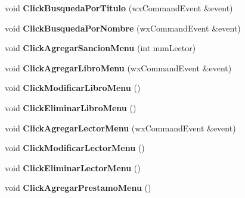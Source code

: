 \begin{DoxyCompactItemize}
\item 
void {\bfseries Click\+Busqueda\+Por\+Titulo} (wx\+Command\+Event \&event)\hypertarget{class_vprincipal_af929cb33fa3c5d6c3566a22a8b0de760}{}\label{class_vprincipal_af929cb33fa3c5d6c3566a22a8b0de760}

\item 
void {\bfseries Click\+Busqueda\+Por\+Nombre} (wx\+Command\+Event \&event)\hypertarget{class_vprincipal_ac2431b119c528a1395f56f426340d930}{}\label{class_vprincipal_ac2431b119c528a1395f56f426340d930}

\item 
void {\bfseries Click\+Agregar\+Sancion\+Menu} (int num\+Lector)\hypertarget{class_vprincipal_a4103b2f0ca0be4c514f3d81216df7805}{}\label{class_vprincipal_a4103b2f0ca0be4c514f3d81216df7805}

\item 
void {\bfseries Click\+Agregar\+Libro\+Menu} (wx\+Command\+Event \&event)\hypertarget{class_vprincipal_a0716d64c67c3e4c97980c6475018bf31}{}\label{class_vprincipal_a0716d64c67c3e4c97980c6475018bf31}

\item 
void {\bfseries Click\+Modificar\+Libro\+Menu} ()\hypertarget{class_vprincipal_ae8728d96a1528116d1980620651b831e}{}\label{class_vprincipal_ae8728d96a1528116d1980620651b831e}

\item 
void {\bfseries Click\+Eliminar\+Libro\+Menu} ()\hypertarget{class_vprincipal_ab2bb7ddddea0a8d31e4cb2eb355fbde6}{}\label{class_vprincipal_ab2bb7ddddea0a8d31e4cb2eb355fbde6}

\item 
void {\bfseries Click\+Agregar\+Lector\+Menu} (wx\+Command\+Event \&event)\hypertarget{class_vprincipal_a8a320e4d57369df4cf216697d9b98b55}{}\label{class_vprincipal_a8a320e4d57369df4cf216697d9b98b55}

\item 
void {\bfseries Click\+Modificar\+Lector\+Menu} ()\hypertarget{class_vprincipal_a40acdd47cfdefa0ee633ce3f1ea3a79d}{}\label{class_vprincipal_a40acdd47cfdefa0ee633ce3f1ea3a79d}

\item 
void {\bfseries Click\+Eliminar\+Lector\+Menu} ()\hypertarget{class_vprincipal_a33fced51b1e48407b6a37f3d9eb963f8}{}\label{class_vprincipal_a33fced51b1e48407b6a37f3d9eb963f8}

\item 
void {\bfseries Click\+Agregar\+Prestamo\+Menu} ()\hypertarget{class_vprincipal_a97e136123deaf0ed419202baf5d04878}{}\label{class_vprincipal_a97e136123deaf0ed419202baf5d04878}


\end{DoxyCompactItemize}

